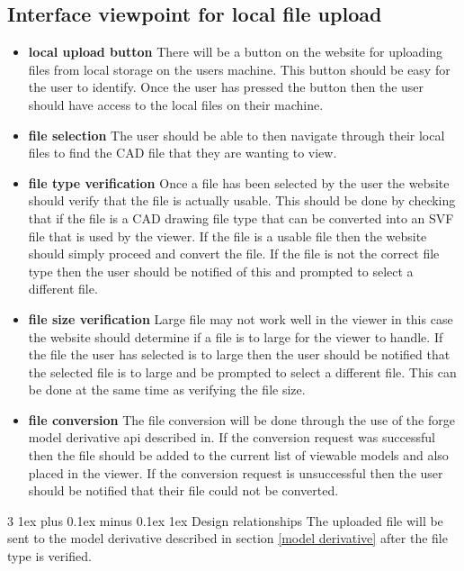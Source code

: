 \documentclass[letterpaper, 10pt, draftclsnofoot, compsoc, onecolumn]{IEEEtran}
\makeatletter
\def\subsubsection{\@startsection{subsubsection}%
                                 {3}%
                                 {\z@}%
                                 {1ex plus 0.1ex minus 0.1ex}%
                                 {1ex}%
                                 {\normalfont\normalsize}}%
\makeatother
\begin{document}
\subsection{Interface viewpoint for local file upload}
\begin{itemize}
	\item[]\textbf{local upload button} There will be a button on the website for uploading files from local storage on the users machine. This button should be easy for the user to identify. Once the user has pressed the button then the user should have access to the local files on their machine.
	\item[]\textbf{file selection} The user should be able to then navigate through their local files to find the CAD file that they are wanting to view.
	\item[]\textbf{file type verification} Once a file has been selected by the user the website should verify that the file is actually usable. This should be done by checking that if the file is a CAD drawing file type that can be converted into an SVF file that is used by the viewer. If the file is a usable file then the website 			should simply proceed and convert the file. If the file is not the correct file type then the user should be notified of this and prompted to select a different file.  
	\item[]\textbf{file size verification} Large file may not work well in the viewer in this case the website should determine if a file is to large for the viewer to handle. If the file the user has selected is to large then the user should be notified that the selected file is to large and be prompted to select a different file.
	This can be done at the same time as verifying the file size.
	\item[]\textbf{file conversion} The file conversion will be done through the use of the forge model derivative api described in. If the conversion request was successful then the file should be added to the current list of viewable models and also placed in the viewer. If the conversion request is unsuccessful then the user should be notified that their file could not be converted. 
\end{itemize}

\subsubsection{Design relationships}
	The uploaded file will be sent to the model derivative described in section \ref{model derivative} after the file type is verified.
	
\end{document}
